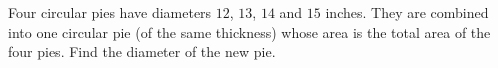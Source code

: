 Four circular pies have diameters $12$, $13$, $14$ and $15$ inches. They are combined into one circular pie (of the same thickness) whose area is the total area of the four pies. Find the diameter of the new pie.
